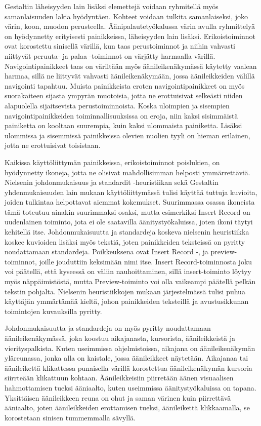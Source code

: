 \documentclass[utf8]{gradu3}
\begin{document}
Gestaltin läheisyyden lain lisäksi elemettejä voidaan ryhmitellä myös samanlaisuuden lakia hyödyntäen. Kohteet voidaan tulkita samanlaiseksi, joko värin, koon, muodon perusteella. Äänipalautetyökalussa värin avulla ryhmittelyä on hyödynnetty erityisesti painikkeissa, läheisyyden lain lisäksi. Erikoistoiminnot ovat korostettu sinisellä värillä, kun taas perustoiminnot ja niihin vahvasti niittyvät peruuta- ja palaa -toiminnot on värjätty harmaalla värillä. Navigointipainikkeet taas on väriltään myös äänileikenäkymässä käytetty vaalean harmaa, sillä ne liittyvät vahvasti äänileikenäkymään, jossa äänileikkeiden välillä navigointi tapahtuu. Muista painikkeista eroten navigointipainikkeet on myös suorakaiteen sijasta ympyrän muotoisia, jotta ne erottuisivat selkeästi niiden alapuolella sijaitsevista perustoiminnoista. Koska uloimpien ja sisempien navigointipainikkeiden toiminnallisuuksissa on eroja, niin kaksi sisimmäistä painiketta on kooltaan suurempia, kuin kaksi ulommaista painiketta. Lisäksi ulommissa ja sisemmissä painikkeissa olevien nuolien tyyli on hieman erilainen, jotta ne erottuisivat toisistaan.

Kaikissa käyttöliittymän painikkeissa, erikoistoiminnot poislukien, on hyödynnetty ikoneja, jotta ne olisivat mahdollisimman helposti ymmärrettäviä. Nielsenin johdonmukaisuus ja standardit -heuristiikan sekä Gestaltin yhdenmukaisuuden lain mukaan käyttöliittymässä tulisi käyttää tuttuja kuvioita, joiden tulkintaa helpottavat aiemmat kokemukset. Suurimmassa osassa ikoneista tämä toteutuu ainakin suurimmaksi osaksi, mutta esimerkiksi Insert Record on uudenlainen toiminto, jota ei ole saatavilla äänitystyökaluissa, joten ikoni täytyi kehitellä itse. Johdonmukaisuutta ja standardeja koskeva nielsenin heuristiikka koskee kuvioiden lisäksi myös tekstiä, joten painikkeiden teksteissä on pyritty noudattamaan standardeja. Poikkeuksena ovat Insert Record -, ja preview-toiminnot, joille jouduttiin keksimään nimi itse. Insert Record-toiminnosta joku voi päätellä, että kyseessä on väliin nauhoittaminen, sillä insert-toiminto löytyy myös näppäimistöstä, mutta Preview-toiminto voi olla vaikeampi päätellä pelkän tekstin pohjalta. Nielsenin heuristiikkojen mukaan järjestelmässä tulisi puhua käyttäjän ymmärtämää kieltä, johon painikkeiden teksteillä ja avustusikkunan toimintojen kuvauksilla pyritty.

Johdonmukaisuutta ja standardeja on myös pyritty noudattamaan äänileikenäkymässä, joka koostuu aikajanasta, kursorista, äänileikkeistä ja vierityspalkista. Kuten useimmissa ohjelmistoissa, aikajana on äänileikenäkymän yläreunassa, jonka alla on kaistale, jossa äänileikkeet näytetään. Aikajanaa tai äänileikettä klikattessa punaisella värillä korostettua äänileikenäkymän kursoria siirrteään klikattuun kohtaan. Äänileikkeisiin piirretään äänen visuaalisen hahmottamisen tueksi ääniaalto, kuten useimmissa äänitystyökaluissa on tapana. Yksittäisen äänileikkeen reuna on ohut ja saman värinen kuin piirrettävä ääniaalto, joten äänileikkeiden erottamisen tueksi, äänileikettä klikkaamalla, se korostetaan sinisen tummemmalla sävyllä.
\end{document}
